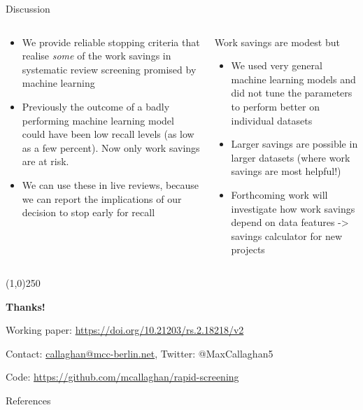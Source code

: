 \documentclass[9pt, aspectratio=169]{beamer}
\begin{document}
\begin{frame}{Discussion}

\begin{columns}
	\begin{column}{0.618\linewidth}
		 \begin{itemize}
		 	\item We provide reliable stopping criteria that realise \textit{some} of the work savings in systematic review screening promised by machine learning
		 	\item Previously the outcome of a badly performing machine learning model could have been low recall levels (as low as a few percent). Now only work savings are at risk.
		 	\item We can use these in live reviews, because we can report the implications of our decision to stop early for recall
		 \end{itemize}
	\end{column}
	\begin{column}{0.382\linewidth}
		Work savings are modest but
		\begin{itemize}
			\item We used very general machine learning models and did not tune the parameters to perform better on individual datasets
			\item Larger savings are possible in larger datasets (where work savings are most helpful!)
			\item Forthcoming work will investigate how work savings depend on data features -> savings calculator for new projects
		\end{itemize}
	\end{column}
\end{columns}

\begin{center}
	\line(1,0){250}
	
	\medskip
	
	\textbf{Thanks!}
	
	\medskip
	
	Working paper: \url{https://doi.org/10.21203/rs.2.18218/v2}
	
	Contact: \url{callaghan@mcc-berlin.net}, Twitter: @MaxCallaghan5
	
	Code: \url{https://github.com/mcallaghan/rapid-screening}
	
\end{center}

\end{frame}


\begin{frame}{References}
\tiny

\end{frame}
\end{document}
